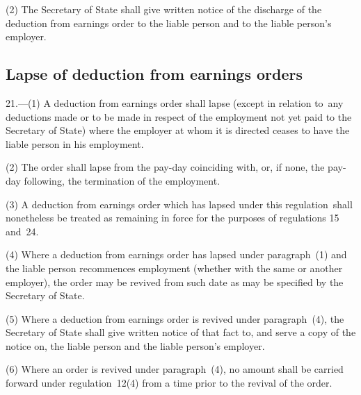 \documentclass[12pt,a4paper]{article}
\begin{document}
(2) The Secretary of State shall give written notice of the discharge of the deduction from earnings order to the liable person and to the liable person’s employer.


\subsection[21. Lapse of deduction from earnings orders]{Lapse of deduction from earnings orders}

21.—(1) A deduction from earnings order shall lapse (except in relation to~any deductions made or to be made in respect of the employment not yet paid to the Secretary of State) where the employer at whom it is directed ceases to have the liable person in his employment.

(2) The order shall lapse from the pay-day coinciding with, or, if none, the pay-day following, the termination of the employment.

(3) A deduction from earnings order which has lapsed under this regulation~shall nonetheless be treated as remaining in force for the purposes of regulations 15 and~24.

(4) Where a deduction from earnings order has lapsed under paragraph~(1) and the liable person recommences employment (whether with the same or another employer), the order may be revived from such date as may be specified by the Secretary of State.

(5) Where a deduction from earnings order is revived under paragraph~(4), the Secretary of State shall give written notice of that fact to, and serve a copy of the notice on, the liable person and the liable person’s employer.

(6) Where an order is revived under paragraph~(4), no amount shall be carried forward under regulation~12(4)%
from a time prior to the revival of the order.

\end{document}
